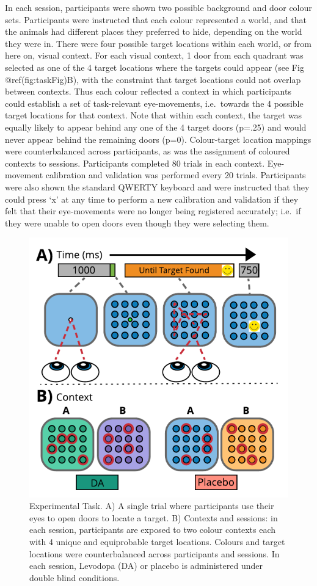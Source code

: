 \documentclass{article}
\begin{document}
In each session, participants were shown two possible background and
door colour sets. Participants were instructed that each colour
represented a world, and that the animals had different places they
preferred to hide, depending on the world they were in. There were four
possible target locations within each world, or from here on, visual
context. For each visual context, 1 door from each quadrant was selected
as one of the 4 target locations where the targets could appear (see Fig
@ref(fig:taskFig)B), with the constraint that target locations could not
overlap between contexts. Thus each colour reflected a context in which
participants could establish a set of task-relevant eye-movements,
i.e.~towards the 4 possible target locations for that context. Note that
within each context, the target was equally likely to appear behind any
one of the 4 target doors (p=.25) and would never appear behind the
remaining doors (p=0). Colour-target location mappings were
counterbalanced across participants, as was the assignment of coloured
contexts to sessions. Participants completed 80 trials in each context.
Eye-movement calibration and validation was performed every 20 trials.
Participants were also shown the standard QWERTY keyboard and were
instructed that they could press `x' at any time to perform a new
calibration and validation if they felt that their eye-movements were no
longer being registered accurately; i.e.~if they were unable to open
doors even though they were selecting them.

\begin{figure}

{\centering \includegraphics[width=0.7\linewidth]{../../images/DA_ExpTask} 

}

\caption{Experimental Task. A) A single trial where participants use their eyes to open doors to locate a target. B) Contexts and sessions: in each session, participants are exposed to two colour contexts each with 4 unique and equiprobable target locations. Colours and target locations were counterbalanced across participants and sessions. In each session, Levodopa (DA) or placebo is administered under double blind conditions.}\label{fig:taskfig}
\end{figure}
\end{document}

